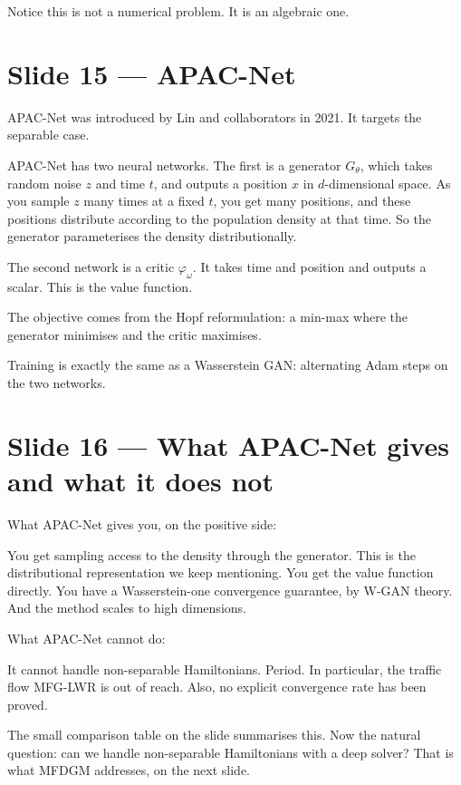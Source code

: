 \documentclass[11pt]{article}
\begin{document}
Notice this is not a numerical problem.  It is an algebraic one.

\section*{Slide 15 --- APAC-Net}

APAC-Net was introduced by Lin and collaborators in 2021.  It targets
the separable case.

APAC-Net has two neural networks.  The first is a generator $G_\theta$,
which takes random noise $z$ and time $t$, and outputs a position $x$
in $d$-dimensional space.  As you sample $z$ many times at a fixed $t$,
you get many positions, and these positions distribute according to the
population density at that time.  So the generator parameterises the
density distributionally.

The second network is a critic $\varphi_\omega$.  It takes time and
position and outputs a scalar.  This is the value function.

The objective comes from the Hopf reformulation: a min-max where the
generator minimises and the critic maximises.

Training is exactly the same as a Wasserstein GAN: alternating Adam
steps on the two networks.

\section*{Slide 16 --- What APAC-Net gives and what it does not}

What APAC-Net gives you, on the positive side:

You get sampling access to the density through the generator.  This is
the distributional representation we keep mentioning.  You get the
value function directly.  You have a Wasserstein-one convergence
guarantee, by W-GAN theory.  And the method scales to high dimensions.

What APAC-Net cannot do:

It cannot handle non-separable Hamiltonians.  Period.  In particular,
the traffic flow MFG-LWR is out of reach.  Also, no explicit convergence
rate has been proved.

The small comparison table on the slide summarises this.  Now the
natural question: can we handle non-separable Hamiltonians with a deep
solver?  That is what MFDGM addresses, on the next slide.
\end{document}
